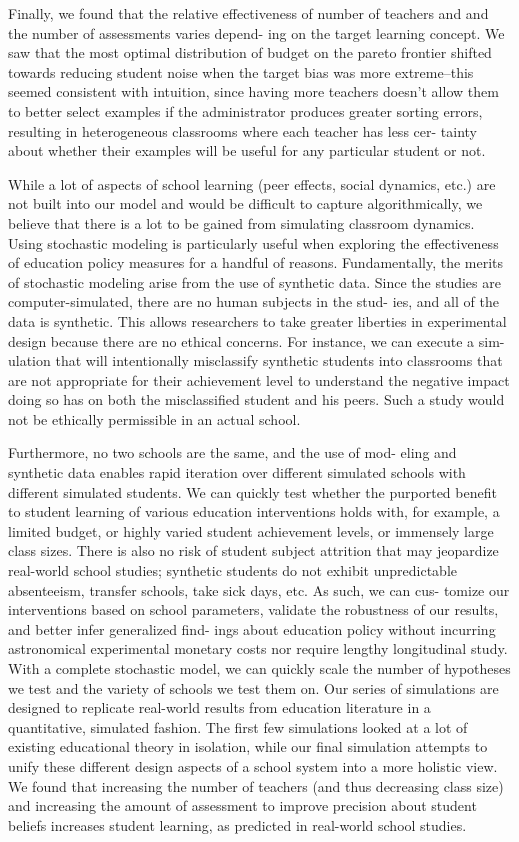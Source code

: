 \documentclass[10pt, letterpaper]{article}
\begin{document}
Finally, we found that the relative effectiveness of number of teachers
and and the number of assessments varies depend- ing on the target
learning concept. We saw that the most optimal distribution of budget on
the pareto frontier shifted towards reducing student noise when the
target bias was more extreme--this seemed consistent with intuition,
since having more teachers doesn't allow them to better select examples
if the administrator produces greater sorting errors, resulting in
heterogeneous classrooms where each teacher has less cer- tainty about
whether their examples will be useful for any particular student or not.

While a lot of aspects of school learning (peer effects, social
dynamics, etc.) are not built into our model and would be difficult to
capture algorithmically, we believe that there is a lot to be gained
from simulating classroom dynamics. Using stochastic modeling is
particularly useful when exploring the effectiveness of education policy
measures for a handful of reasons. Fundamentally, the merits of
stochastic modeling arise from the use of synthetic data. Since the
studies are computer-simulated, there are no human subjects in the stud-
ies, and all of the data is synthetic. This allows researchers to take
greater liberties in experimental design because there are no ethical
concerns. For instance, we can execute a sim- ulation that will
intentionally misclassify synthetic students into classrooms that are
not appropriate for their achievement level to understand the negative
impact doing so has on both the misclassified student and his peers.
Such a study would not be ethically permissible in an actual school.

Furthermore, no two schools are the same, and the use of mod- eling and
synthetic data enables rapid iteration over different simulated schools
with different simulated students. We can quickly test whether the
purported benefit to student learning of various education interventions
holds with, for example, a limited budget, or highly varied student
achievement levels, or immensely large class sizes. There is also no
risk of student subject attrition that may jeopardize real-world school
studies; synthetic students do not exhibit unpredictable absenteeism,
transfer schools, take sick days, etc. As such, we can cus- tomize our
interventions based on school parameters, validate the robustness of our
results, and better infer generalized find- ings about education policy
without incurring astronomical experimental monetary costs nor require
lengthy longitudinal study. With a complete stochastic model, we can
quickly scale the number of hypotheses we test and the variety of
schools we test them on. Our series of simulations are designed to
replicate real-world results from education literature in a
quantitative, simulated fashion. The first few simulations looked at a
lot of existing educational theory in isolation, while our final
simulation attempts to unify these different design aspects of a school
system into a more holistic view. We found that increasing the number of
teachers (and thus decreasing class size) and increasing the amount of
assessment to improve precision about student beliefs increases student
learning, as predicted in real-world school studies.
\end{document}
